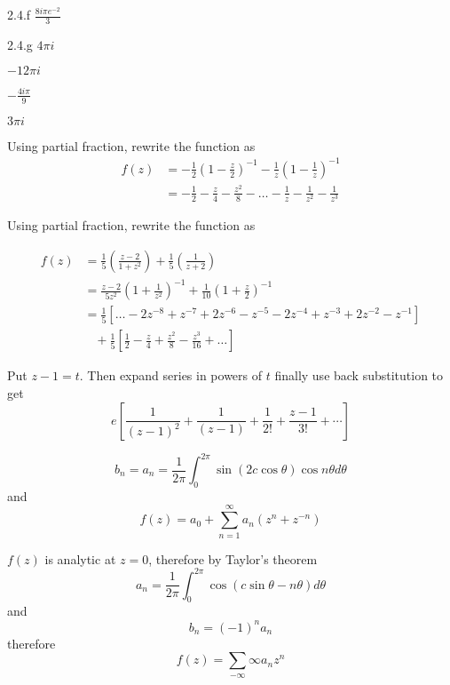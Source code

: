\begin{Solution}{2.4.f}
$\frac{8 i \pi e^{-2}}{3}$
\end{Solution}
\begin{Solution}{2.4.g}
$4 \pi i$
\end{Solution}
\begin{Solution}{2.5}
$-12 \pi i$
\end{Solution}
\begin{Solution}{2.6}
$-\frac{4i\pi}{9}$
\end{Solution}
\begin{Solution}{2.7}
$3\pi i$
\end{Solution}
\begin{Solution}{3.1}
Using partial fraction, rewrite the function as
\begin{align*}
f(z) & =-\frac{1}{2}\left(1-\frac{z}{2}\right)^{-1}-\frac{1}{z}\left(1-\frac{1}{z}\right)^{-1}\\
 & =-\frac{1}{2}-\frac{z}{4}-\frac{z^{2}}{8}-\ldots-\frac{1}{z}-\frac{1}{z^{2}}-\frac{1}{z^{3}}
 \end{align*}
\end{Solution}
\begin{Solution}{3.2}
Using partial fraction, rewrite the function as

\begin{align*}
f(z) & =\frac{1}{5}\left(\frac{z-2}{1+z^{2}}\right)+\frac{1}{5}\left(\frac{1}{z+2}\right)\\
 & =\frac{z-2}{5z^{2}}\left(1+\frac{1}{z^{2}}\right)^{-1}+\frac{1}{10}\left(1+\frac{z}{2}\right)^{-1}\\
 & =\frac{1}{5}\left[\ldots-2z^{-8}+z^{-7}+2z^{-6}-z^{-5}-2z^{-4}+z^{-3}+2z^{-2}-z^{-1}\right]\\
 & \;\;\;+\frac{1}{5}\left[\frac{1}{2}-\frac{z}{4}+\frac{z^{2}}{8}-\frac{z^{3}}{16}+\ldots\right]\end{align*}
\end{Solution}
\begin{Solution}{3.3}
Put $z-1=t$. Then expand series in powers of $t$ finally use back substitution to get
\[e\left[\frac{1}{(z-1)^2}+\frac{1}{(z-1)}+\frac{1}{2!}+\frac{z-1}{3!} + \cdots \right]\]
\end{Solution}
\begin{Solution}{3.4}
\[b_n = a_n = \frac{1}{2\pi}\int_0^{2\pi}\sin(2c \cos \theta)\cos n\theta d\theta\]
and
\[f(z) = a_0 + \sum_{n=1}^{\infty}a_{n}(z^{n}+z^{-n})\]
\end{Solution}
\begin{Solution}{3.5}
$f(z)$ is analytic at $z=0$, therefore by Taylor's theorem
\[a_n =\frac{1}{2\pi}\int_0^{2\pi}\cos(c\sin \theta -n\theta) d\theta \]
and
\[b_n = (-1)^n a_n\]
therefore
\[f(z) = \sum_{-\infty}{\infty} a_nz^n\]
\end{Solution}
